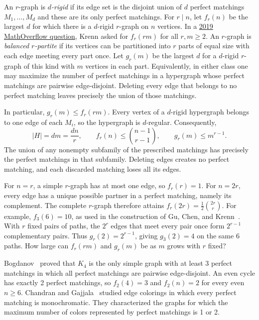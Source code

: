 \documentclass[10pt]{article}
\numberwithin{equation}{section}
\theoremstyle{definition}
\begin{document}
An $r$-graph is \emph{$d$-rigid} if its edge set is the disjoint union of $d$ perfect matchings $M_1,\ldots,M_d$ and these are its only perfect matchings. For $r\mid n$, let $f_r(n)$ be the largest $d$ for which there is a $d$-rigid $r$-graph on $n$ vertices. In a \href{https://mathoverflow.net/questions/347793/hypergraphs-with-only-disjoint-perfect-matchings}{2019 MathOverflow question}, Krenn asked for $f_r(rm)$ for all $r,m\ge2$. An $r$-graph is \emph{balanced $r$-partite} if its vertices can be partitioned into $r$ parts of equal size with each edge meeting every part once. Let $g_r(m)$ be the largest $d$ for a $d$-rigid $r$-graph of this kind with $m$ vertices in each part. Equivalently, in either class one may maximize the number of perfect matchings in a hypergraph whose perfect matchings are pairwise edge-disjoint. Deleting every edge that belongs to no perfect matching leaves precisely the union of those matchings.

In particular, $g_r(m)\le f_r(rm)$. Every vertex of a $d$-rigid hypergraph belongs to one edge of each $M_i$, so the hypergraph is $d$-regular. Consequently,
\[
 |H|=dm=\frac{dn}{r},
 \qquad
 f_r(n)\le\binom{n-1}{r-1},
 \qquad
 g_r(m)\le m^{r-1}.
\]
The union of any nonempty subfamily of the prescribed matchings has precisely the perfect matchings in that subfamily. Deleting edges creates no perfect matching, and each discarded matching loses all its edges.

For $n=r$, a simple $r$-graph has at most one edge, so $f_r(r)=1$. For $n=2r$, every edge has a unique possible partner in a perfect matching, namely its complement. The complete $r$-graph therefore attains $f_r(2r)=\frac12\binom{2r}{r}$. For example, $f_3(6)=10$, as used in the construction of Gu, Chen, and Krenn~\cite{GuChenKrenn2020}. With $r$ fixed pairs of paths, the $2^r$ edges that meet every pair once form $2^{r-1}$ complementary pairs. Thus $g_r(2)=2^{r-1}$, giving $g_3(2)=4$ on the same 6 paths. How large can $f_r(rm)$ and $g_r(m)$ be as $m$ grows with $r$ fixed?

Bogdanov~\cite{Bogdanov2017} proved that $K_4$ is the only simple graph with at least 3 perfect matchings in which all perfect matchings are pairwise edge-disjoint. An even cycle has exactly 2 perfect matchings, so $f_2(4)=3$ and $f_2(n)=2$ for every even $n\ge6$. Chandran and Gajjala~\cite{ChandranGajjala2026} studied edge colorings in which every perfect matching is monochromatic. They characterized the graphs for which the maximum number of colors represented by perfect matchings is 1 or 2.
\end{document}
